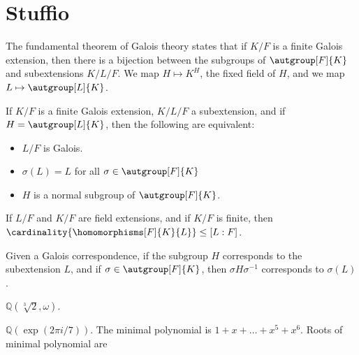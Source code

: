 \documentclass{article}                                                        %
\begin{document}
    \section{Stuffio}
        The fundamental theorem of Galois theory states that if $K/F$ is a
        finite Galois extension, then there is a bijection between the subgroups
        of $\autgroup[F]{K}$ and subextensions $K/L/F$. We map
        $H\mapsto{K}^{H}$, the fixed field of $H$, and we map
        $L\mapsto\autgroup[L]{K}$.
        \begin{theorem}
            If $K/F$ is a finite Galois extension, $K/L/F$ a subextension, and
            if $H=\autgroup[L]{K}$, then the following are equivalent:
            \begin{itemize}
                \item $L/F$ is Galois.
                \item $\sigma(L)=L$ for all $\sigma\in\autgroup[F]{K}$
                \item $H$ is a normal subgroup of $\autgroup[F]{K}$.
            \end{itemize}
        \end{theorem}
        \begin{theorem}
            If $L/F$ and $K/F$ are field extensions, and if $K/F$ is finite,
            then $\cardinality{\homomorphisms[F]{K}{L}}\leq[L:F]$.
        \end{theorem}
        \begin{theorem}
            Given a Galois correspondence, if the subgroup $H$ corresponds to
            the subextension $L$, and if $\sigma\in\autgroup[F]{K}$, then
            $\sigma{H}\sigma^{\minus{1}}$ corresponds to $\sigma(L)$.
        \end{theorem}
        \begin{example}
            $\mathbb{Q}(\sqrt[3]{2},\omega)$.
        \end{example}
        \begin{example}
            $\mathbb{Q}(\exp(2\pi{i}/7))$. The minimal polynomial is
            $1+x+\dots+x^{5}+x^{6}$. Roots of minimal polynomial are 
        \end{example}
\end{document}
